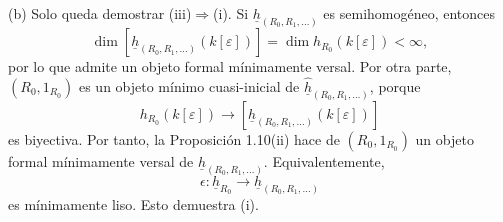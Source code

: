 
(b) Solo queda demostrar (iii)$\Rightarrow$(i). Si
$\underline h_{(R_0,R_1,\ldots)}$ es semihomogéneo, entonces
\[
 \dim[\underline h_{(R_0,R_1,\ldots)}(k[\varepsilon])]
 =\dim h_{R_0}(k[\varepsilon])<\infty,
\]
por lo que admite un objeto formal mínimamente versal. Por otra parte,
$(R_0,1_{R_0})$ es un objeto mínimo cuasi-inicial de
$\widehat{\underline h}_{(R_0,R_1,\ldots)}$, porque
\[
 h_{R_0}(k[\varepsilon])
 \longrightarrow
 [\underline h_{(R_0,R_1,\ldots)}(k[\varepsilon])]
\]
es biyectiva. Por tanto, la Proposición 1.10(ii) hace de
$(R_0,1_{R_0})$ un objeto formal mínimamente versal de
$\underline h_{(R_0,R_1,\ldots)}$. Equivalentemente,
\[
 \epsilon:\underline h_{R_0}
 \longrightarrow\underline h_{(R_0,R_1,\ldots)}
\]
es mínimamente liso. Esto demuestra (i).
